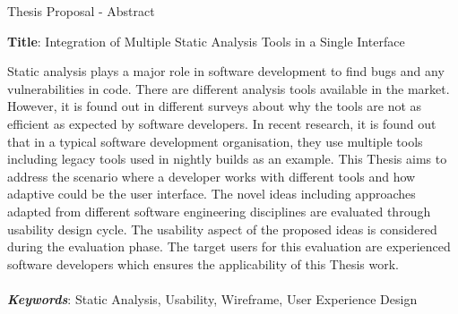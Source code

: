 \documentclass{article}
\begin{document}
	
	\begin{center}
		Thesis Proposal - Abstract 
	\end{center}

\begin{center}
	\textbf{Title}: Integration of Multiple Static Analysis Tools in a Single Interface \\
\end{center}	

Static analysis plays a major role in software development to find bugs and any vulnerabilities in code. There are different analysis tools available in the market. However, it is found out in different surveys about why the tools are not as efficient as expected by software developers. In recent research, it is found out that in a typical software development organisation, they use multiple tools including legacy tools used in nightly builds as an example. This Thesis aims to address the scenario where a developer works with different tools and how adaptive could be the user interface. The novel ideas including approaches adapted from different software engineering disciplines are evaluated through usability design cycle. The usability aspect of the proposed ideas is considered during the evaluation phase. The target users for this evaluation are experienced software developers which ensures the applicability of this Thesis work. \\ \\
\textbf{\textit{Keywords}}: Static Analysis, Usability, Wireframe, User Experience Design
	
\end{document}
